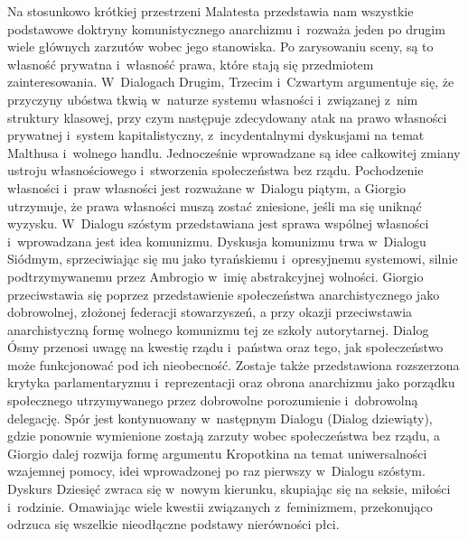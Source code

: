 \documentclass[oneside,polish,11pt,sfheadings]{mwbk}
\begin{document}
 
Na stosunkowo krótkiej przestrzeni Malatesta przedstawia nam wszystkie podstawowe doktryny komunistycznego anarchizmu i~rozważa jeden po drugim wiele głównych zarzutów wobec jego stanowiska. Po zarysowaniu sceny, są to własność prywatna i~własność prawa, które stają się przedmiotem zainteresowania. W~Dialogach Drugim, Trzecim i~Czwartym argumentuje się, że
przyczyny ubóstwa tkwią w~naturze systemu własności i~związanej z~nim struktury klasowej, przy czym następuje
zdecydowany atak na prawo własności prywatnej i~system kapitalistyczny, z~incydentalnymi dyskusjami na temat Malthusa i~wolnego handlu. Jednocześnie wprowadzane są idee całkowitej zmiany ustroju własnościowego i~stworzenia społeczeństwa
bez rządu. Pochodzenie własności i~praw własności jest rozważane w~Dialogu piątym, a Giorgio utrzymuje, że prawa
własności muszą zostać zniesione, jeśli ma się uniknąć wyzysku. W~Dialogu szóstym przedstawiana jest sprawa wspólnej
własności i~wprowadzana jest idea komunizmu. Dyskusja komunizmu trwa w~Dialogu Siódmym, sprzeciwiając się mu jako
tyrańskiemu i~opresyjnemu systemowi, silnie podtrzymywanemu przez Ambrogio w~imię abstrakcyjnej wolności. Giorgio
przeciwstawia się poprzez przedstawienie społeczeństwa anarchistycznego jako dobrowolnej, złożonej federacji
stowarzyszeń, a przy okazji przeciwstawia anarchistyczną formę wolnego komunizmu tej ze szkoły autorytarnej. Dialog
Ósmy przenosi uwagę na kwestię rządu i~państwa oraz tego, jak społeczeństwo może funkcjonować pod ich nieobecność.
Zostaje także przedstawiona rozszerzona krytyka parlamentaryzmu i~reprezentacji oraz obrona anarchizmu jako porządku
społecznego utrzymywanego przez dobrowolne porozumienie i~dobrowolną delegację. Spór jest kontynuowany w~następnym
Dialogu (Dialog dziewiąty), gdzie ponownie wymienione zostają zarzuty wobec społeczeństwa bez rządu, a Giorgio dalej
rozwija formę argumentu Kropotkina na temat uniwersalności wzajemnej pomocy, idei wprowadzonej po raz pierwszy w~Dialogu szóstym. Dyskurs Dziesięć zwraca się w~nowym kierunku, skupiając się na seksie, miłości i~rodzinie. Omawiając
wiele kwestii związanych z~feminizmem, przekonująco odrzuca się wszelkie nieodłączne podstawy nierówności płci. 
\end{document}
